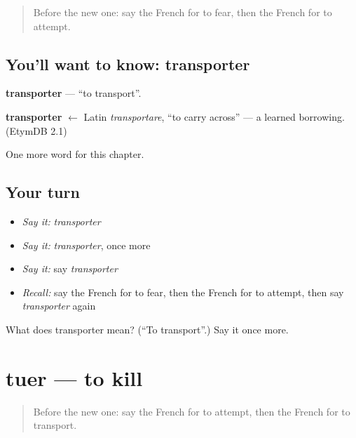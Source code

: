 \label{lesson:FR-C211-transporter}



\begin{quote}
Before the new one: say the French for to fear, then the French for to attempt.
\end{quote}

\subsection*{You'll want to know: transporter}
\textbf{transporter} — \textquotedblleft{}to transport\textquotedblright{}.

\begin{cousinweb}
\textbf{transporter} $\leftarrow$ Latin \emph{transportare}, \textquotedblleft{}to carry across\textquotedblright{} — a learned borrowing. (EtymDB 2.1)
\end{cousinweb}

\begin{grammarlens}[title={What you've built}]
One more word for this chapter.
\end{grammarlens}

\subsection*{Your turn}
\begin{itemize}
\raggedright
  \item \emph{Say it:} \emph{transporter}
  \item \emph{Say it:} \emph{transporter}, once more
  \item \emph{Say it:} say \emph{transporter}
  \item \emph{Recall:} say the French for to fear, then the French for to attempt, then say \emph{transporter} again
\end{itemize}

\begin{tcolorbox}[breakable,colback=teal!4,colframe=teal!35!black,title={Before you move on}]
What does transporter mean? (\textquotedblleft{}To transport\textquotedblright{}.) Say it once more.
\end{tcolorbox}
\section[tuer]{tuer — to kill}

\label{lesson:FR-C211-tuer}



\begin{quote}
Before the new one: say the French for to attempt, then the French for to transport.
\end{quote}

